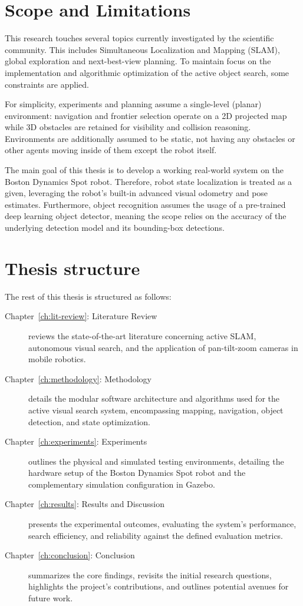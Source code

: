 \documentclass[
	parspace, %
	noindent, %
	final, %
]{elteikthesis}
\begin{document}
\section{Scope and Limitations}
This research touches several topics currently investigated by the scientific community. This includes Simultaneous Localization and Mapping (SLAM), global exploration and next-best-view planning. To maintain focus on the implementation and algorithmic optimization of the active object search, some constraints are applied. 

For simplicity, experiments and planning assume a single-level (planar) environment: navigation and frontier selection operate on a 2D projected map while 3D obstacles are retained for visibility and collision reasoning. Environments are additionally assumed to be static, not having any obstacles or other agents moving inside of them except the robot itself.

The main goal of this thesis is to develop a working real-world system on the Boston Dynamics Spot robot. Therefore, robot state localization is treated as a given, leveraging the robot's built-in advanced visual odometry and pose estimates. Furthermore, object recognition assumes the usage of a pre-trained deep learning object detector, meaning the scope relies on the accuracy of the underlying detection model and its bounding-box detections.

\pagebreak
\section{Thesis structure}
The rest of this thesis is structured as follows:

\begin{description}
    \item[Chapter~\ref{ch:lit-review}: Literature Review] reviews the state-of-the-art literature concerning active SLAM, autonomous visual search, and the application of pan-tilt-zoom cameras in mobile robotics.
    \item[Chapter~\ref{ch:methodology}: Methodology] details the modular software architecture and algorithms used for the active visual search system, encompassing mapping, navigation, object detection, and state optimization.
    \item[Chapter~\ref{ch:experiments}: Experiments] outlines the physical and simulated testing environments, detailing the hardware setup of the Boston Dynamics Spot robot and the complementary simulation configuration in Gazebo.
    \item[Chapter~\ref{ch:results}: Results and Discussion] presents the experimental outcomes, evaluating the system's performance, search efficiency, and reliability against the defined evaluation metrics.
    \item[Chapter~\ref{ch:conclusion}: Conclusion] summarizes the core findings, revisits the initial research questions, highlights the project's contributions, and outlines potential avenues for future work.
\end{description}
\end{document}
